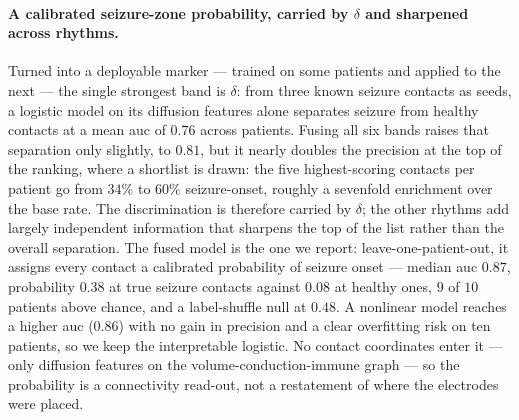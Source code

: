 \paragraph{A calibrated seizure-zone probability, carried by \(\delta\) and sharpened across rhythms.}
Turned into a deployable marker --- trained on some patients and applied to the next --- the single strongest band is \(\delta\): from three known seizure contacts as seeds, a logistic model on its diffusion features alone separates seizure from healthy contacts at a mean \gls{auc} of \(0.76\) across patients. Fusing all six bands raises that separation only slightly, to \(0.81\), but it nearly doubles the precision at the top of the ranking, where a shortlist is drawn: the five highest-scoring contacts per patient go from \(34\%\) to \(60\%\) seizure-onset, roughly a sevenfold enrichment over the base rate. The discrimination is therefore carried by \(\delta\); the other rhythms add largely independent information that sharpens the top of the list rather than the overall separation. The fused model is the one we report: leave-one-patient-out, it assigns every contact a calibrated probability of seizure onset --- median \gls{auc} \(0.87\), probability \(0.38\) at true seizure contacts against \(0.08\) at healthy ones, \(9\) of \(10\) patients above chance, and a label-shuffle null at \(0.48\). A nonlinear model reaches a higher \gls{auc} (\(0.86\)) with no gain in precision and a clear overfitting risk on ten patients, so we keep the interpretable logistic. No contact coordinates enter it --- only diffusion features on the volume-conduction-immune graph --- so the probability is a connectivity read-out, not a restatement of where the electrodes were placed.
